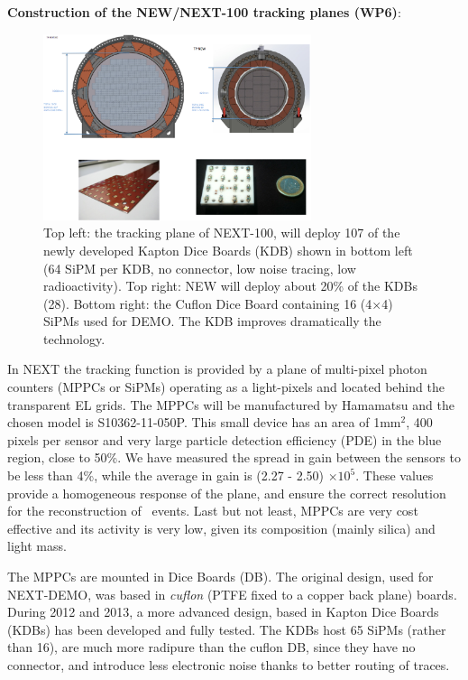 %
 {\bf  Construction of the NEW/NEXT-100 tracking planes (WP6)}:

\begin{figure}[tbhp!]
\begin{center}
\includegraphics[width=0.7\textwidth]{img/TPNext-100.png}
\end{center}
\caption{Top left: the tracking plane of NEXT-100, will deploy 107 of the newly developed Kapton Dice Boards (KDB) shown in bottom left (64 SiPM per KDB, no connector, low noise tracing, low radioactivity). Top right: NEW will deploy about 20\% of the KDBs (28). Bottom right: the Cuflon Dice Board containing 16 (4$\times$4) SiPMs used for DEMO. The KDB improves dramatically the technology.} 
\label{fig.db2}
\end{figure}

In NEXT the tracking function is provided by a plane of multi-pixel photon counters (MPPCs or SiPMs) operating as a light-pixels and located behind the transparent EL grids. The MPPCs will be manufactured by Hamamatsu and the chosen model is S10362-11-050P. This small device has an area of 1mm$^2$, 400 pixels per sensor and very large 
particle detection efficiency (PDE) in the blue region, close to 50\%. We have measured the spread in gain between the sensors to be less than 4\%, while the average in gain is (2.27 - 2.50) $\times10^5$. These values provide a homogeneous response of the plane, and ensure the correct resolution for the reconstruction of \bb\ events. Last but not least, MPPCs are very cost effective and its activity is very low, given its composition (mainly silica) and  light mass. 

The MPPCs are mounted in Dice Boards (DB). The original design, used for NEXT-DEMO, was based in   {\em cuflon} (PTFE fixed to a copper back plane) boards. During 2012 and 2013, a more advanced design, based in Kapton Dice Boards (KDBs) has been developed and fully tested. The KDBs host 65 SiPMs (rather than 16), are much more radipure than the  cuflon DB, since they have no connector, and introduce less electronic noise thanks to better routing of traces. 

